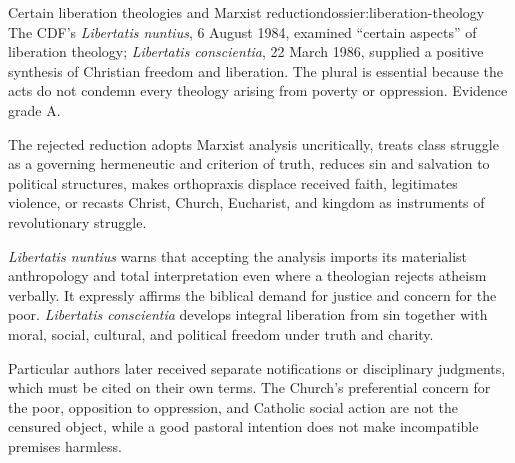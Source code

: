 \begin{heresydossier}{Certain liberation theologies and Marxist reduction}{dossier:liberation-theology}
\objectfield The CDF's \emph{Libertatis nuntius}, 6 August 1984, examined ``certain aspects'' of liberation theology; \emph{Libertatis conscientia}, 22 March 1986, supplied a positive synthesis of Christian freedom and liberation. The plural is essential because the acts do not condemn every theology arising from poverty or oppression. Evidence grade A.

\propositionfield The rejected reduction adopts Marxist analysis uncritically, treats class struggle as a governing hermeneutic and criterion of truth, reduces sin and salvation to political structures, makes orthopraxis displace received faith, legitimates violence, or recasts Christ, Church, Eucharist, and kingdom as instruments of revolutionary struggle.

\responsefield \emph{Libertatis nuntius} warns that accepting the analysis imports its materialist anthropology and total interpretation even where a theologian rejects atheism verbally. It expressly affirms the biblical demand for justice and concern for the poor. \emph{Libertatis conscientia} develops integral liberation from sin together with moral, social, cultural, and political freedom under truth and charity.

\aftermathfield Particular authors later received separate notifications or disciplinary judgments, which must be cited on their own terms. The Church's preferential concern for the poor, opposition to oppression, and Catholic social action are not the censured object, while a good pastoral intention does not make incompatible premises harmless.
\end{heresydossier}

